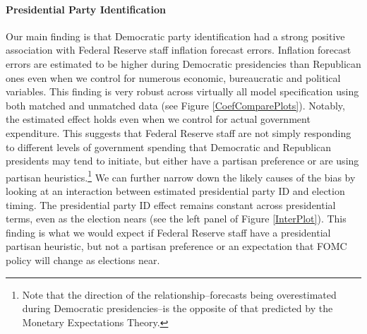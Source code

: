 \documentclass[a4paper]{article}\usepackage{graphicx, color}
\begin{document}
\paragraph{Presidential Party Identification}

Our main finding is that Democratic party identification had a strong positive association with Federal Reserve staff inflation forecast errors. Inflation forecast errors are estimated to be higher during Democratic presidencies than Republican ones even when we control for numerous economic, bureaucratic and political variables. This finding is very robust across virtually all model specification using both matched and unmatched data (see Figure \ref{CoefComparePlots}). Notably, the estimated effect holds even when we control for actual government expenditure. This suggests that Federal Reserve staff are not simply responding to different levels of government spending that Democratic and Republican presidents may tend to initiate, but either have a partisan preference or are using partisan heuristics.\footnote{Note that the direction of the relationship--forecasts being overestimated during Democratic presidencies--is the opposite of that predicted by the Monetary Expectations Theory.} We can further narrow down the likely causes of the bias by looking at an interaction between estimated presidential party ID and election timing. The presidential party ID effect remains constant across presidential terms, even as the election nears (see the left panel of Figure \ref{InterPlot}). This finding is what we would expect if Federal Reserve staff have a presidential partisan heuristic, but not a partisan preference or an expectation that FOMC policy will change as elections near.
\end{document}
